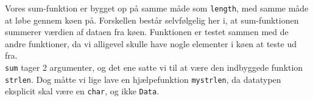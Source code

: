 
Vores sum-funktion er bygget op på samme måde som \verb+length+, med samme måde at løbe gennem 
køen på. Forskellen består selvfølgelig her i, at sum-funktionen summerer værdien af dataen fra køen. 
Funktionen er testet sammen med de andre funktioner, da vi alligevel skulle have nogle elementer i køen 
at teste ud fra. \\

\noindent \verb+sum+ tager 2 argumenter, og det ene satte vi til at være den indbyggede funktion 
\verb+strlen+. Dog måtte vi lige lave en hjælpefunktion \verb+mystrlen+, da datatypen eksplicit skal være
 en \verb+char+, og ikke \verb+Data+. 